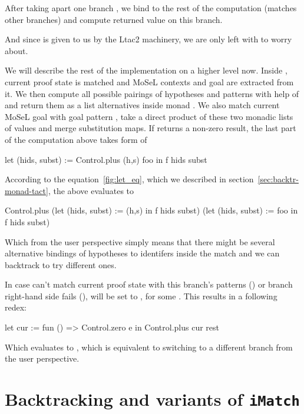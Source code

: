 After taking apart one branch , we bind  to the rest of the computation (matches other branches) and compute returned value on this branch.

And since  is given to us by the Ltac2 machinery, we are only left with  to worry about.

We will describe the rest of the implementation on a higher level now.
Inside , current proof state is matched and MoSeL contexts and goal are extracted from it.
We then compute all possible pairings of hypotheses and patterns with help of  and return them as a list alternatives inside monad .
We also match current MoSeL goal with goal pattern , take a direct product of these two monadic lists of values and merge substitution maps.
If  returns a non-zero result, the last part of the computation above takes form of
\begin{coq}
let (hids, subst) := Control.plus (h,s) foo in
f hids subst
\end{coq}

According to the equation~\ref{fig:let_eq}, which we described in section~\ref{sec:backtr-monad-tact}, the above evaluates to
\begin{coq}
Control.plus
  (let (hids, subst) := (h,s) in
    f hids subst)
  (let (hids, subst) := foo in
   f hids subst)
\end{coq}

Which from the user perspective simply means that there might be several alternative bindings of hypotheses to identifers inside the match and we can backtrack to try different ones.

In case  can't match current proof state with this branch's patterns () or branch right-hand side fails (),  will be set to , for some .
This results in a following redex:
\begin{coq}
let cur := fun () => Control.zero e
in Control.plus cur rest
\end{coq}
Which evaluates to , which is equivalent to switching to a different branch from the user perspective.

\section{Backtracking and variants of \texttt{iMatch}}

